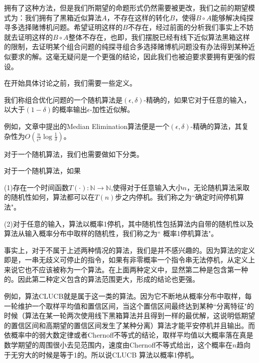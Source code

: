 \documentclass[bachelor]{thuthesis}
\begin{document}
拥有了这种方法，但是我们所期望的命题形式仍然需要被更改，我们之前的期望模式为：我们拥有了黑箱近似算法$A$，不存在这样的转化$B$，使得$B\circ A$能够解决纯探寻多选择赌博机问题。希望证明这样的$B$不存在，经过前面的分析我们事实上不妨就去证明这样的$B\circ A$整体不存在，也即，我们摆脱已经有线下近似算法黑箱这样的限制，去证明某个组合问题的纯探寻组合多选择赌博机问题没有办法得到某种近似要求的解。这毫无疑问是一个更强的结论，因此我们也被迫要求要拥有更强的假设。

在开始具体讨论之前，我们需要一些定义。

\begin{definition}

我们称组合优化问题的一个随机算法是$(\epsilon,\delta)$-精确的，如果它对于任意的输入，以大于$(1-\delta)$的概率输出$\epsilon$-加性近似解。

\end{definition}

例如，文章\cite{lower}中提出的Median Elimination算法便是一个$(\epsilon,\delta)$-精确的算法，其复杂性为$O\left(\frac{n}{\epsilon^2}\log\frac{1}{\delta}\right)$。

对于一个随机算法，我们也需要做如下分类。

\begin{definition}

对于一个随机算法，如果

(1)存在一个时间函数$T(\cdot):\mathbb{N}\to \mathbb{N}$,使得对于任意输入大小$n$，无论随机算法采取的随机性如何，算法都可以在$T(n)$步之内停机。我们称之为``确定时间停机算法"。

(2)对于任意的输入，算法以概率1停机，其中随机性包括算法内自带的随机性以及算法从输入概率分布中取样的随机性，我们称之为`` 概率1停机算法"。

\end{definition}

事实上，对于不属于上述两种情况的算法，我们是并不感兴趣的。因为算法的定义即是，一串无歧义可停止的指令，如果有非零概率一个指令串无法停机，从定义上来说它也不应该被称为一个算法。在上面两种定义中，显然第二种是包含第一种的。因此第二种定义包含的算法范围更大，形成的结论也更强。

例如，算法CLUCB就是属于这一类的算法。因为它不断地从概率分布中取样，每一轮维护一个取样平均值和置信区间，当这个置信区间最终达到某种``分离特征"的时候（算法在某一轮两次使用线下黑箱算法并且得到一样的最优解，这说明低期望的置信区间和高期望的置信区间发生了某种分离）算法才能平安停机并且输出。而依概率中的弱大数定律或者Chernoff不等式的结论，取样平均值以大概率落在真是数学期望的周围很小去见范围内，速度由Chernoff不等式给出，这个概率在$n$趋向于无穷大的时候是等于1的。所以说CLUCB 算法以概率1停机。
\end{document}

